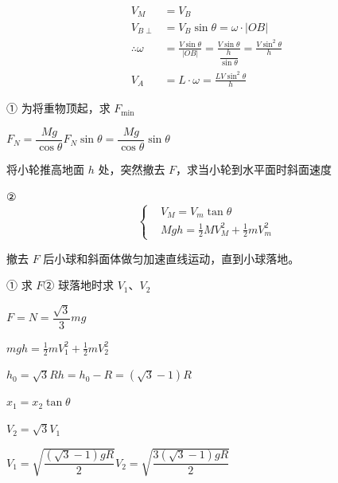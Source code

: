 \begin{align*}
V_M&=V_B\\
V_{B\perp}&=V_B\sin\theta=\omega\cdot|OB|\\
\therefore\omega&=\frac{V\sin\theta}{|OB|}=\frac{V\sin\theta}{\dfrac{h}{\sin\theta}}=\frac{V\sin^{2}\theta}{h}\\
V_A&=L\cdot\omega=\frac{LV\sin^{2}\theta}{h}
\end{align*}%


\begin{problem}[{[1]}]
① 为将重物顶起，求 $F_{\min}$

\noindent $F_N=\dfrac{Mg}{\cos\theta}$\qquad $F_N\sin\theta=\dfrac{Mg}{\cos\theta}\sin\theta$

\noindent 将小轮推高地面 $h$ 处，突然撤去 $F$，求当小轮到水平面时斜面速度

\noindent ②
\[
\left\{\begin{aligned}
&V_M=V_m\tan\theta\\
&Mgh=\tfrac12MV_M^{2}+\tfrac12mV_m^{2}
\end{aligned}\right.
\]
\end{problem}

\begin{problem}[{[2]}]
撤去 $F$ 后小球和斜面体做匀加速直线运动，直到小球落地。

\noindent ① 求 $F$\quad ② 球落地时求 $V_1$、$V_2$

\noindent $F=N=\dfrac{\sqrt3}{3}mg$

\noindent $mgh=\tfrac12mV_1^{2}+\tfrac12mV_2^{2}$

\noindent $h_0=\sqrt3R$\quad $h=h_0-R=(\sqrt3-1)R$

\noindent $x_1=x_2\tan\theta$

\noindent $V_2=\sqrt3V_1$

\noindent $V_1=\sqrt{\dfrac{(\sqrt3-1)gR}{2}}$\quad $V_2=\sqrt{\dfrac{3(\sqrt3-1)gR}{2}}$
\end{problem}

